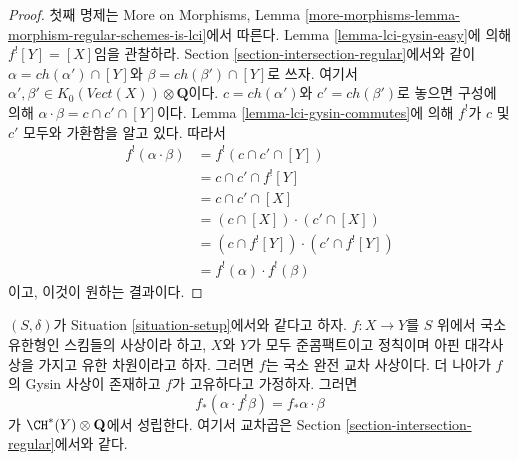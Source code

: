 \begin{proof}
첫째 명제는 More on Morphisms, Lemma
\ref{more-morphisms-lemma-morphism-regular-schemes-is-lci}에서 따른다.
Lemma \ref{lemma-lci-gysin-easy}에 의해 $f^![Y] = [X]$임을 관찰하라.
Section \ref{section-intersection-regular}에서와 같이
$\alpha = ch(\alpha') \cap [Y]$와 $\beta = ch(\beta') \cap [Y]$로 쓰자.
여기서 $\alpha', \beta' \in K_0(\textit{Vect}(X)) \otimes \mathbf{Q}$이다.
$c = ch(\alpha')$와 $c' = ch(\beta')$로 놓으면 구성에 의해
$\alpha \cdot \beta = c \cap c' \cap [Y]$이다. Lemma
\ref{lemma-lci-gysin-commutes}에 의해 $f^!$가 $c$ 및 $c'$ 모두와
가환함을 알고 있다. 따라서
\begin{align*}
f^!(\alpha \cdot \beta)
& =
f^!(c \cap c' \cap [Y]) \\
& =
c \cap c' \cap f^![Y] \\
& =
c \cap c' \cap [X] \\
& =
(c \cap [X]) \cdot (c' \cap [X]) \\
& =
(c \cap f^![Y]) \cdot (c' \cap f^![Y]) \\
& =
f^!(\alpha) \cdot f^!(\beta)
\end{align*}
이고, 이것이 원하는 결과이다.
\end{proof}

\begin{lemma}
\label{lemma-projection-formula-regular}
$(S, \delta)$가 Situation \ref{situation-setup}에서와 같다고 하자.
$f : X \to Y$를 $S$ 위에서 국소 유한형인 스킴들의 사상이라 하고,
$X$와 $Y$가 모두 준콤팩트이고 정칙이며 아핀 대각사상을 가지고 유한
차원이라고 하자. 그러면 $f$는 국소 완전 교차 사상이다. 더 나아가
$f$의 Gysin 사상이 존재하고 $f$가 고유하다고 가정하자. 그러면
$$
f_*(\alpha \cdot f^!\beta) = f_*\alpha \cdot \beta
$$
가 $\CH^*(Y) \otimes \mathbf{Q}$에서 성립한다. 여기서 교차곱은 Section
\ref{section-intersection-regular}에서와 같다.
\end{lemma}

